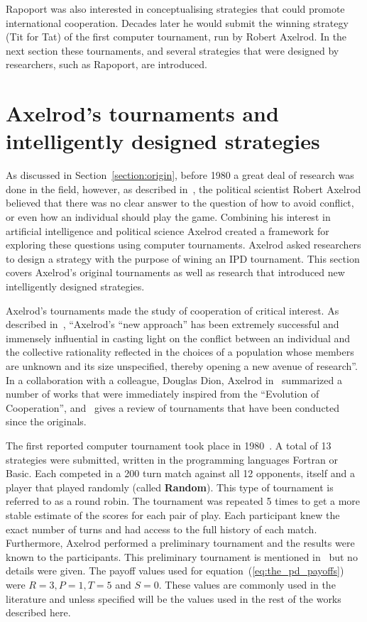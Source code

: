 Rapoport was also interested in conceptualising strategies that could promote
international cooperation. Decades later he would submit the winning strategy
(Tit for Tat) of the first computer tournament, run by Robert Axelrod.
In the next section these tournaments,
and several strategies that were designed by researchers, such as Rapoport, are
introduced.

\section{Axelrod's tournaments and intelligently designed strategies}
\label{section:intelligent_design}

As discussed in Section~\ref{section:origin}, before 1980 a great deal of
research was done in the field, however, as described in~\cite{Axelrod2012}, the
political scientist Robert Axelrod believed that there was no clear answer to the
question of how to avoid conflict, or even how an individual should play the
game. Combining his interest in artificial intelligence and political science
Axelrod created a framework for exploring these questions using computer
tournaments. Axelrod asked researchers to design a strategy with the purpose of
wining an IPD tournament. This section covers Axelrod's original
tournaments as well as research that introduced new intelligently designed
strategies.

Axelrod's tournaments made the study of cooperation of critical interest. As
described in~\cite{Rapoport2015}, ``Axelrod's “new approach” has been extremely
successful and immensely influential in casting light on the conflict between an
individual and the collective rationality reflected in the choices of a
population whose members are unknown and its size unspecified, thereby opening a
new avenue of research''. In a collaboration with a colleague, Douglas Dion,
Axelrod in~\cite{Axelrod1988} summarized a number of works that were immediately
inspired from the ``Evolution of Cooperation'', and~\cite{Jurisic2012} gives a
review of tournaments that have been conducted since the originals.

The first reported computer tournament took place in 1980~\cite{Axelrod1980a}. A
total of 13 strategies were submitted, written in the programming languages
Fortran or Basic. Each competed in a 200 turn match against all 12 opponents,
itself and a player that played randomly (called \textbf{Random}). This type of
tournament is referred to as a round robin. The tournament was repeated 5 times
to get a more stable estimate of the scores for each pair of play.
Each participant knew the exact number of turns and had access to the full
history of each match. Furthermore, Axelrod performed a preliminary tournament
and the results were known to the participants. This preliminary tournament is
mentioned in~\cite{Axelrod1980a} but no details were given. The payoff values
used for equation~(\ref{eq:the_pd_payoffs}) were \(R=3, P=1, T=5\) and \(S=0\).
These values are commonly used in the literature and unless specified will be
the values used in the rest of the works described here.

